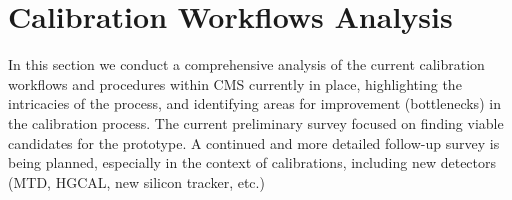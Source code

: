 \section{Calibration Workflows Analysis}
In this section we conduct a comprehensive analysis of the current calibration workflows and procedures within CMS currently in place, highlighting the intricacies of the process, and identifying areas for improvement (bottlenecks) in the calibration process.
The current preliminary survey focused on finding viable candidates for the prototype. 
A continued and more detailed follow-up survey is being planned, especially in the context of \Phasetwo calibrations, including new detectors (MTD, HGCAL, new silicon tracker, etc.)

%


